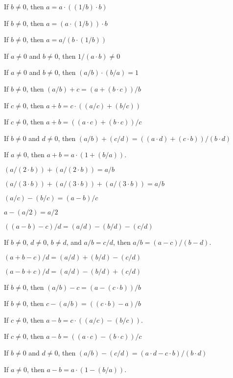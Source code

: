 \documentclass{article}
\begin{document}
\begin{thm}
\item\label{xcmplx1:108} If $b\neq0$, then $a=a\cdot((1/b)\cdot b)$
\item\label{xcmplx1:109} If $b\neq0$, then $a=(a\cdot(1/b))\cdot b$
\item\label{xcmplx1:110} If $b\neq0$, then $a=a/(b\cdot(1/b))$
\item\label{xcmplx1:111} If $a\neq0$ and $b\neq0$, then $1/(a\cdot b)\neq0$
\item\label{xcmplx1:112} If $a\neq0$ and $b\neq0$, then $(a/b)\cdot(b/a)=1$
  \bigbreak
\item\label{xcmplx1:113} If $b\neq0$, then $(a/b)+c=(a+(b\cdot c))/b$
\item\label{xcmplx1:114} If $c\neq0$, then $a+b=c\cdot((a/c)+(b/c))$
\item\label{xcmplx1:115} If $c\neq0$, then $a+b=((a\cdot c)+(b\cdot c))/c$
\item\label{xcmplx1:116} If $b\neq0$ and $d\neq0$,
  then $(a/b)+(c/d)=((a\cdot d)+(c\cdot b))/(b\cdot d)$
\item\label{xcmplx1:117} If $a\neq0$, then $a+b=a\cdot(1+(b/a))$.
  \bigbreak
\item\label{xcmplx1:118} $(a/(2\cdot b))+(a/(2\cdot b))=a/b$
  \bigbreak
\item\label{xcmplx1:119} $(a/(3\cdot b))+(a/(3\cdot b))+(a/(3\cdot b))=a/b$
\item\label{xcmplx1:120} $(a/c)-(b/c)=(a-b)/c$
\item\label{xcmplx1:121} $a-(a/2)=a/2$
\item\label{xcmplx1:122} $((a-b)-c)/d=(a/d)-(b/d)-(c/d)$
\item\label{xcmplx1:123} If $b\neq0$, $d\neq0$, $b\neq d$, and $a/b=c/d$,
  then $a/b=(a-c)/(b-d)$.
  \bigbreak
\item\label{xcmplx1:124} $(a+b-c)/d=(a/d)+(b/d)-(c/d)$
\item\label{xcmplx1:125} $(a-b+c)/d=(a/d)-(b/d)+(c/d)$
  \bigbreak
\item\label{xcmplx1:126} If $b\neq0$, then $(a/b)-c=(a-(c\cdot b))/b$
\item\label{xcmplx1:127} If $b\neq0$, then $c-(a/b)=((c\cdot b)-a)/b$
\item\label{xcmplx1:128} If $c\neq0$, then $a-b=c\cdot((a/c)-(b/c))$.
\item\label{xcmplx1:129} If $c\neq0$, then $a-b=((a\cdot c)-(b\cdot c))/c$
\item\label{xcmplx1:130} If $b\neq0$ and $d\neq0$, then
  $(a/b)-(c/d)=(a\cdot d-c\cdot b)/(b\cdot d)$
\item\label{xcmplx1:131} If $a\neq0$, then $a-b=a\cdot(1-(b/a))$.

\end{thm}
\end{document}
